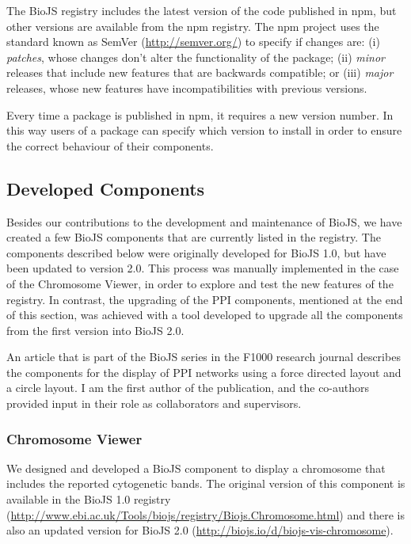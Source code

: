The BioJS registry includes the latest version of the code published in npm, but other versions are available from the npm registry. The npm project uses the standard known as SemVer (\url{http://semver.org/}) to specify if changes are: (i) \emph{patches}, whose changes don't alter the functionality of the package; (ii) \emph{minor} releases that include new features that are backwards compatible; or  (iii) \emph{major} releases, whose new features have incompatibilities with previous versions.

Every time a package is published in npm, it requires a new version number. In this way users of a package can specify which version to install in order to ensure the correct behaviour of their components.



\subsection{Developed Components} \label{subsec:biojs_components}
Besides our contributions to the development and maintenance of BioJS, we have created a few BioJS components that are currently listed in the registry. The components described below were originally developed for BioJS 1.0, but have been updated to version 2.0. This process was manually implemented in the case of the Chromosome Viewer, in order to explore and test the new features of the registry. In contrast, the upgrading of the PPI components, mentioned at the end of this section, was achieved with a tool developed to upgrade all the components from the first version into BioJS 2.0.

An article that is part of the BioJS series in the F1000 research journal describes the components for the display of PPI networks using a force directed layout and a circle layout. I am the first author of the publication, and the co-authors provided input in their role as collaborators and supervisors.

\subsubsection{Chromosome Viewer}
We designed and developed a BioJS component to display a chromosome that includes the reported cytogenetic bands. The original version of this component is available in the BioJS 1.0 registry (\url{http://www.ebi.ac.uk/Tools/biojs/registry/Biojs.Chromosome.html}) and there is also an updated version for  BioJS 2.0 (\url{http://biojs.io/d/biojs-vis-chromosome}).

